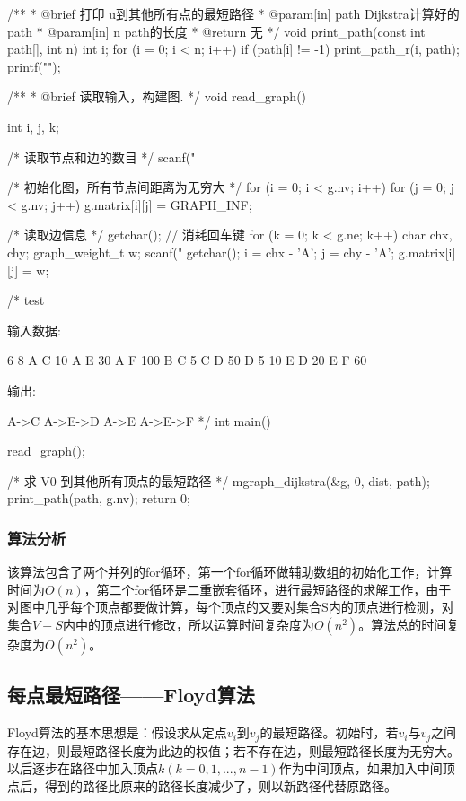 \begin{Codex}[label=mgraph_dijkstra.c]
/**
 * @brief 打印 u到其他所有点的最短路径
 * @param[in] path Dijkstra计算好的path
 * @param[in] n path的长度
 * @return 无
 */
void print_path(const int path[], int n) {
    int i;
    for (i = 0; i < n; i++) if (path[i] != -1) {
        print_path_r(i, path);
        printf("\n");
    }
}

/**
 * @brief 读取输入，构建图.
 */
void read_graph() {
    int i, j, k;

    /* 读取节点和边的数目 */
    scanf("%

    /* 初始化图，所有节点间距离为无穷大 */
    for (i = 0; i < g.nv; i++) {
        for (j = 0; j < g.nv; j++) {
            g.matrix[i][j] = GRAPH_INF;
        }
    }

    /* 读取边信息 */
    getchar(); // 消耗回车键
    for (k = 0; k < g.ne; k++) {
        char chx, chy;
        graph_weight_t w;
        scanf("%
        getchar();
        i = chx - 'A';
        j = chy - 'A';
        g.matrix[i][j] = w;
    }
}

/* test

输入数据:

6 8
A C 10
A E 30
A F 100
B C 5
C D 50
D 5 10
E D 20
E F 60

输出:

A->C
A->E->D
A->E
A->E->F
*/
int main() {
    read_graph();

    /* 求 V0 到其他所有顶点的最短路径 */
    mgraph_dijkstra(&g, 0, dist, path);
    print_path(path, g.nv);
    return 0;
}
\end{Codex}

\subsubsection{算法分析}
该算法包含了两个并列的for循环，第一个for循环做辅助数组的初始化工作，计算时间为$O(n)$，第二个for循环是二重嵌套循环，进行最短路径的求解工作，由于对图中几乎每个顶点都要做计算，每个顶点的又要对集合S内的顶点进行检测，对集合$V-S$内中的顶点进行修改，所以运算时间复杂度为$O(n^2)$。算法总的时间复杂度为$O(n^2)$。


\subsection{每点最短路径——Floyd算法}
Floyd算法的基本思想是：假设求从定点$v_i$到$v_j$的最短路径。初始时，若$v_i$与$v_j$之间存在边，则最短路径长度为此边的权值；若不存在边，则最短路径长度为无穷大。以后逐步在路径中加入顶点$k(k=0,1,...,n-1)$作为中间顶点，如果加入中间顶点后，得到的路径比原来的路径长度减少了，则以新路径代替原路径。

